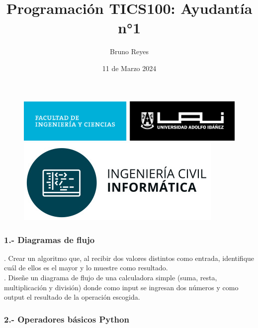 \documentclass{article}
\begin{document}
\begin{figure}
    \centering
    \begin{minipage}{0.45\textwidth}
      \centering
      \includegraphics[width=1.2\linewidth]{../img/logo-fic.png}
    \end{minipage}\hfill
    \begin{minipage}{0.45\textwidth}
      \centering
      \includegraphics[width=0.8\linewidth]{../img/logo-informatica.jpeg}
    \end{minipage}
    \vspace{-1cm}
\end{figure}

\title{Programación TICS100: Ayudantía n°1}
\author{Bruno Reyes}
\date{11 de Marzo 2024}


\maketitle

\subsubsection*{1.- Diagramas de flujo}

. Crear un algoritmo que, al recibir dos valores distintos como entrada, identifique cuál de ellos es el mayor y lo muestre como resultado.\\

. Diseñe un diagrama de flujo de una calculadora simple (suma, resta, multiplicación y división) donde como input se ingresan dos números y como output el resultado de la operación escogida. \\

\subsubsection*{2.- Operadores básicos Python}
\end{document}
